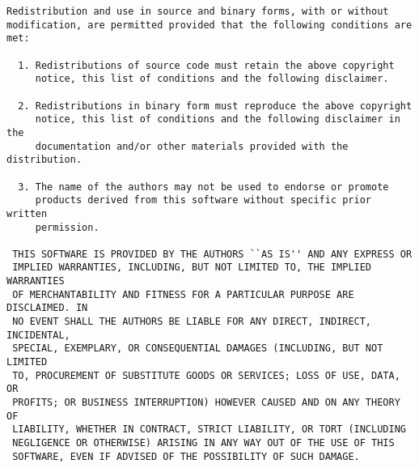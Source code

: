 \documentclass[11pt]{book}
\begin{document}
\begin{verbatim}
Redistribution and use in source and binary forms, with or without
modification, are permitted provided that the following conditions are met:
 
  1. Redistributions of source code must retain the above copyright
     notice, this list of conditions and the following disclaimer.
 
  2. Redistributions in binary form must reproduce the above copyright
     notice, this list of conditions and the following disclaimer in the
     documentation and/or other materials provided with the distribution.
 
  3. The name of the authors may not be used to endorse or promote
     products derived from this software without specific prior written
     permission.
 
 THIS SOFTWARE IS PROVIDED BY THE AUTHORS ``AS IS'' AND ANY EXPRESS OR
 IMPLIED WARRANTIES, INCLUDING, BUT NOT LIMITED TO, THE IMPLIED WARRANTIES
 OF MERCHANTABILITY AND FITNESS FOR A PARTICULAR PURPOSE ARE DISCLAIMED. IN
 NO EVENT SHALL THE AUTHORS BE LIABLE FOR ANY DIRECT, INDIRECT, INCIDENTAL,
 SPECIAL, EXEMPLARY, OR CONSEQUENTIAL DAMAGES (INCLUDING, BUT NOT LIMITED
 TO, PROCUREMENT OF SUBSTITUTE GOODS OR SERVICES; LOSS OF USE, DATA, OR
 PROFITS; OR BUSINESS INTERRUPTION) HOWEVER CAUSED AND ON ANY THEORY OF
 LIABILITY, WHETHER IN CONTRACT, STRICT LIABILITY, OR TORT (INCLUDING
 NEGLIGENCE OR OTHERWISE) ARISING IN ANY WAY OUT OF THE USE OF THIS
 SOFTWARE, EVEN IF ADVISED OF THE POSSIBILITY OF SUCH DAMAGE.

\end{verbatim}
\end{document}
